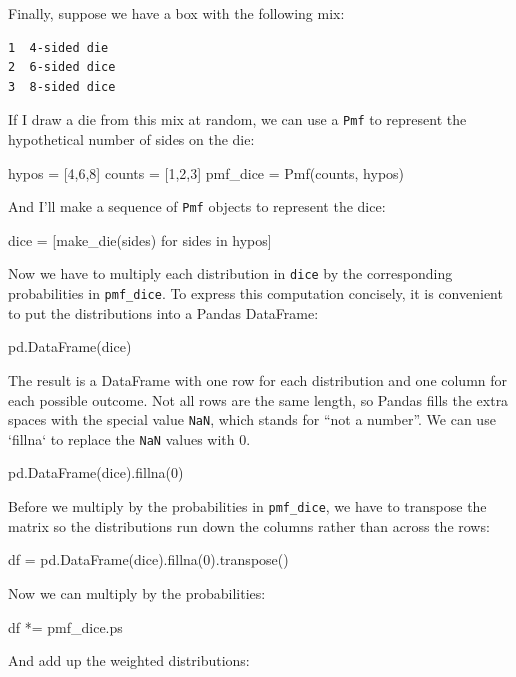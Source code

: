 \documentclass[12pt]{book}
\theoremstyle{exercise}
\newcommand{\py}[1]{{\tt #1}}%
\begin{document}
Finally, suppose we have a box with the following mix:

\begin{verbatim}
1  4-sided die
2  6-sided dice
3  8-sided dice
\end{verbatim}

If I draw a die from this mix at random, we can use a \py{Pmf} to represent the hypothetical number of sides on the die:

\begin{code}
hypos = [4,6,8]
counts = [1,2,3]
pmf_dice = Pmf(counts, hypos)
\end{code}

And I'll make a sequence of \py{Pmf} objects to represent the dice:

\begin{code}
dice = [make_die(sides) for sides in hypos]
\end{code}

Now we have to multiply each distribution in \py{dice} by the corresponding probabilities in \py{pmf_dice}.
To express this computation concisely, it is convenient to put the distributions into a Pandas DataFrame:

\begin{code}
pd.DataFrame(dice)
\end{code}

The result is a DataFrame with one row for each distribution and one column for each possible outcome.
Not all rows are the same length, so Pandas fills the extra spaces with the special value \py{NaN}, which stands for ``not a number''.
We can use `fillna` to replace the \py{NaN} values with 0.

\begin{code}
pd.DataFrame(dice).fillna(0)
\end{code}

Before we multiply by the probabilities in \py{pmf_dice}, we have to transpose the matrix so the distributions run down the columns rather than across the rows:

\begin{code}
df = pd.DataFrame(dice).fillna(0).transpose()
\end{code}

Now we can multiply by the probabilities:

\begin{code}
df *= pmf_dice.ps
\end{code}

And add up the weighted distributions:
\end{document}
